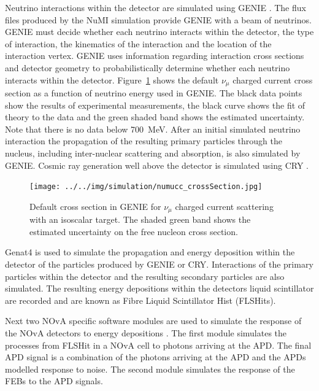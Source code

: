 Neutrino interactions within the detector are simulated using
GENIE \cite{andreopoulos2010genie}. 
The flux files produced by the NuMI simulation provide GENIE with a
beam of neutrinos. GENIE must decide whether each neutrino interacts
within the detector, the type of interaction, the kinematics of the
interaction and the location of the interaction vertex.
GENIE uses information regarding interaction cross sections and detector
geometry to probabilistically determine whether each neutrino
interacts within the detector. 
Figure~\ref{fig:numuCC_xsec} shows the default $\nu_\mu$ charged
current cross section as a function of neutrino energy used in GENIE.
The black data points show the results of experimental measurements,
the black curve shows the fit of theory to the data and the green
shaded band shows the estimated uncertainty. Note that there is no
data below 700~MeV.
After an initial simulated neutrino interaction the propagation of
the resulting primary particles through the nucleus, including
inter-nuclear scattering and absorption, is also simulated by
GENIE. 
Cosmic ray generation well above the detector is simulated using CRY \cite{hagmann2007cosmic}.  

\begin{figure}
  \centering
  \texttt{[image: ../../img/simulation/numucc\_crossSection.jpg]}
  \caption{Default cross section in GENIE for $\nu_\mu$ charged
    current scattering with an isoscalar target. The shaded green band
    shows the estimated uncertainty on the free nucleon cross
    section. \cite{andreopoulos2010genie}}
  \label{fig:numuCC_xsec}
\end{figure}




Genat4 is used to simulate the propagation and energy deposition
within the detector of the particles produced by GENIE or CRY. 
Interactions of the primary particles within the detector and the
resulting secondary particles are also simulated.
The resulting energy depositions within the detectors liquid
scintillator are recorded and are known as Fibre Liquid Scintillator
Hist (FLSHits). 

Next two NOvA specific software modules are used to simulate the
response of the NOvA detectors to energy depositions
\cite{adamNOvASim, adamNOvASimProceedings}. 
The first module simulates the processes from FLSHit in a NOvA cell to photons
arriving at the APD. The final APD signal is a combination of the
photons arriving at the APD and the APDs modelled response to noise.
The second module simulates the response of the FEBs to the APD
signals.  